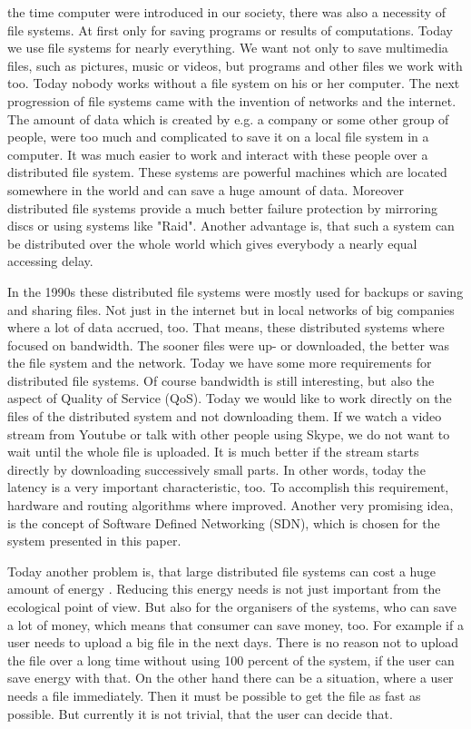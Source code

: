  the time computer were introduced in our society, there was also a necessity of file systems. At first only for saving programs or results of computations. Today we use file systems for nearly everything. We want not only to save multimedia files, such as pictures, music or videos, but programs and other files we work with too. Today nobody works without a file system on his or her  computer. The next progression of file systems came with the invention of networks and the internet. The amount of data which is created by e.g. a company or some other group of people, were too much and complicated to save it on a local file system in a computer. It was much easier to work and interact with these people over a distributed file system. These systems are powerful machines which are located somewhere in the world and can save a huge amount of data. Moreover distributed file systems provide a much better failure protection by mirroring discs or using systems like "Raid". Another advantage is, that such a system can be distributed over the whole world which gives everybody a nearly equal accessing delay. 

In the 1990s these distributed file systems were mostly used for backups or saving and sharing files. Not just in the internet but in local networks of big companies where a lot of data accrued, too. That means, these distributed systems where focused on bandwidth. The sooner files were up- or downloaded, the better was the file system and the network. Today we have some more requirements for distributed file systems. Of course bandwidth is still interesting, but also the aspect of Quality of Service (QoS). Today we would like to work directly on the files of the distributed system and not downloading them. If we watch a video stream from Youtube or talk with other people using Skype, we do not want to wait until the whole file is uploaded. It is much better if the stream starts directly by downloading successively small parts. In other words, today the latency is a very important characteristic, too. To accomplish this requirement, hardware and routing algorithms where improved. Another very promising idea, is the concept of Software Defined Networking (SDN), which is chosen for the system presented in this paper.

Today another problem is, that large distributed file systems can cost a huge amount of energy . Reducing this energy needs is not just important from the ecological point of view. But also for the organisers of the systems, who can save a lot of money, which means that consumer can save money, too. For example if a user needs to upload a big file in the next days. There is no reason not to upload the file over a long time without using 100 percent of the system, if the user can save energy with that. On the other hand there can be a situation, where a user needs a file immediately. Then it must be possible to get the file as fast as possible. But currently it is not trivial, that the user can decide that.  

